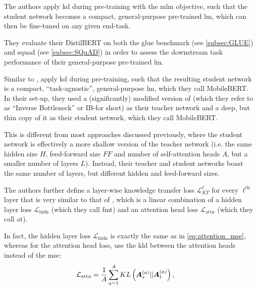 The authors apply \gls{kd} during pre-training with the \gls{mlm} objective, such that the student network becomes a compact, general-purpose pre-trained \gls{lm}, which can then be fine-tuned on any given end-task.

They evaluate their DistilBERT on both the \gls{glue} benchmark (see \cref{subsec:GLUE}) and \gls{squad} (see \cref{subsec:SQuAD}) in order to assess the downstream task performance of their general-purpose pre-trained \gls{lm}.


Similar to \citet{sanh2019distilbert}, \citet{sun2020mobilebert} apply \gls{kd} during pre-training, such that the resulting student network is a compact, ``task-agnostic'', general-purpose \gls{lm}, which they call MobileBERT. In their set-up, they used a (significantly) modified version of \bertlarge (which they refer to as ``Inverse Bottleneck'' \bertlarge or IB-\bertlarge for short) as their teacher network and a deep, but thin copy of it as their student network, which they call MobileBERT.

This is different from most approaches discussed previously, where the student network is effectively a more shallow version of the teacher network (i.e. the same hidden size $H$, feed-forward size $FF$ and number of self-attention heads $A$, but a smaller number of layers $L$). Instead, their teacher and student networks boast the same number of layers, but different hidden and feed-forward sizes.

The authors further define a layer-wise knowledge transfer loss $\mathcal{L}^{\ell}_{KT}$ for every $\ell^\text{th}$ layer that is very similar to that of \citet{jiao2019tinybert}, which is a linear combination of a hidden layer loss $ \mathcal{L}_{\text{hidn}}$ (which they call \gls{fmt}) and an attention head loss $ \mathcal{L}_{\text{attn}}$ (which they call \gls{at}).

In fact, the hidden layer loss $\mathcal{L}_{\text{hidn}}$ is exactly the same as in \cref{eq:attention_mse}, whereas for the attention head loss, \citet{sun2020mobilebert} use the \gls{kld} between the attention heads instead of the \gls{mse}:
\begin{align}
    \mathcal{L}_{\text{attn}} &= \frac{1}{A} \sum_{a=1}^A KL\left( \vect{A}_s^{(a)} || \vect{A}_t^{(a)} \right),
\end{align}

